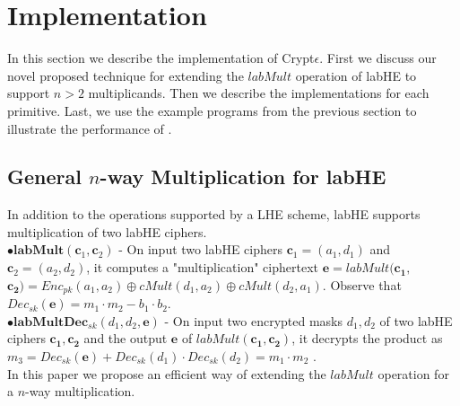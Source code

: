 \section{Implementation}\label{sec:implementaion}
\label{implementation}
In this section we describe the implementation of Crypt$\epsilon$. First we discuss our novel proposed technique for extending the $labMult$ operation of \textsf{labHE} to support $n > 2$ multiplicands. Then we describe the implementations for each primitive. Last, we use the example programs from the previous section to illustrate the performance of \system.

\subsection{\textbf{General $n$-way Multiplication for \textsf{labHE}}}\label{genlab}
In addition to the operations supported by a \textsf{LHE}  scheme, \textsf{labHE} supports multiplication of two \textsf{labHE} ciphers. 
\\ $\bullet \textbf{labMult}(\mathbf{c}_1,\mathbf{c}_2)$ -
On input two \textsf{labHE} ciphers $\mathbf{c}_1=(a_1,d_1)$ and $\mathbf{c}_2=(a_2,d_2)$, it computes a "multiplication" ciphertext  $\mathbf{e}=labMult(\mathbf{c_1,}$ $\mathbf{c_2})=Enc_{pk}(a_1,a_2)\oplus cMult(d_1,a_2) \oplus cMult(d_2,a_1)$. Observe that $Dec_{sk}(\mathbf{e})=m_1\cdot m_2 -b_1 \cdot b_2$.\\
 $\bullet \textbf{labMultDec}_{sk}(d_1,d_2,\mathbf{e})$ - On input two encrypted masks $d_1,d_2$ of two \textsf{labHE} ciphers $\mathbf{c_1},\mathbf{c_2}$ and the output $\mathbf{e}$ of $labMult(\mathbf{c_1},\mathbf{c_2})$, it decrypts the product as $m_3=Dec_{sk}(\mathbf{e})+Dec_{sk}(d_1)\cdot Dec_{sk}(d_2) = m_1\cdot m_2$ .   \\
In this paper we propose an efficient way of extending the $labMult$ operation for a $n$-way multiplication.
